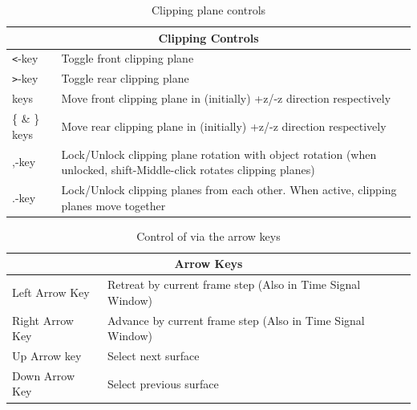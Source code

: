 \begin{table}[htbp]
        \caption{\label{table:clipping} Clipping plane controls}
    \begin{center}
        \begin{tabular}{|l|p{6in}|} \hline
        \multicolumn{2}{|c|}{Clipping Controls} \\ \hline
        \verb|<|-key    &       Toggle front clipping plane \\ \hline
        \verb|>|-key   &       Toggle rear clipping plane \\ \hline
        [ \& ] keys   &     Move front clipping plane in (initially) +z/-z
             direction respectively \\ \hline
        \{ \& \} keys   &   Move rear clipping plane in (initially) +z/-z
                  direction respectively \\ \hline
        ,-key   &  Lock/Unlock clipping plane rotation with object
                   rotation (when unlocked, shift-Middle-click rotates clipping
                   planes) \\ \hline
        .-key   &  Lock/Unlock clipping planes from each other.
                   When active, clipping planes move together \\ \hline
\end{tabular}
\end{center}

\end{table} 

\begin{table}[htbp]
    \caption{\label{table:arrowkeys} Control of \map{} via the arrow keys}
\begin{center}
    \begin{tabular}{|l|l|} \hline
        \multicolumn{2}{|c||}{\textbf{Arrow Keys}} \\ \hline
        Left Arrow Key  &       Retreat by current frame step (Also in Time
        Signal Window) \\ 
        Right Arrow Key &       Advance by current frame step (Also in Time
        Signal Window)\\ 
        Up Arrow key    &       Select next surface \\
        Down Arrow Key  &       Select previous surface \\ \hline
    \end{tabular}
\end{center}

\end{table}



